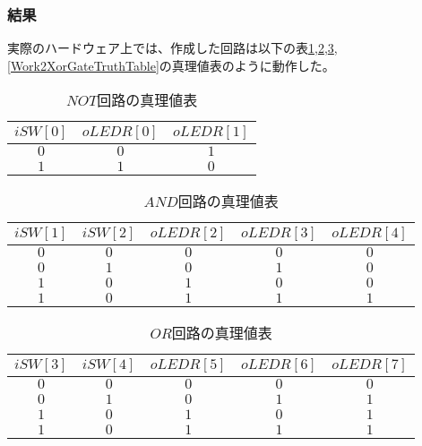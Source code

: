 \documentclass[a4paper]{jarticle}
\begin{document}
\subsubsection{結果}
実際のハードウェア上では、作成した回路は以下の表\ref{Work2NotGateTruthTable},\ref{Work2AndGateTruthTable},\ref{Work2OrGateTruthTable},\ref{Work2XorGateTruthTable}の真理値表のように動作した。
\begin{table}[ht]
	\begin{center}
		\caption{$NOT$回路の真理値表}
		\label{Work2NotGateTruthTable}
		\begin{tabular}{|c|c|c|}
			\hline
			$iSW \left[ 0 \right]$	&$oLEDR \left[ 0 \right]$	&$oLEDR \left[ 1 \right]$\\	\hline\hline
			$0$			&$0$				&$1$\\				\hline
			$1$			&$1$				&$0$\\				\hline
		\end{tabular}
	\end{center}
\end{table}
\begin{table}[ht]
	\begin{center}
		\caption{$AND$回路の真理値表}
		\label{Work2AndGateTruthTable}
		\begin{tabular}{|c|c|c|c|c|}
			\hline
			$iSW \left[ 1 \right]$	&$iSW \left[ 2 \right]$	&$oLEDR \left[ 2 \right]$	&$oLEDR \left[ 3 \right]$	&$oLEDR \left[ 4 \right]$\\	\hline\hline
			$0$			&$0$			&$0$				&$0$				&$0$\\				\hline
			$0$			&$1$			&$0$				&$1$				&$0$\\				\hline
			$1$			&$0$			&$1$				&$0$				&$0$\\				\hline
			$1$			&$0$			&$1$				&$1$				&$1$\\				\hline
		\end{tabular}
	\end{center}
\end{table}
\begin{table}[ht]
	\begin{center}
		\caption{$OR$回路の真理値表}
		\label{Work2OrGateTruthTable}
		\begin{tabular}{|c|c|c|c|c|}
			\hline
			$iSW \left[ 3 \right]$	&$iSW \left[ 4 \right]$	&$oLEDR \left[ 5 \right]$	&$oLEDR \left[ 6 \right]$	&$oLEDR \left[ 7 \right]$\\	\hline\hline
			$0$			&$0$			&$0$				&$0$				&$0$\\				\hline
			$0$			&$1$			&$0$				&$1$				&$1$\\				\hline
			$1$			&$0$			&$1$				&$0$				&$1$\\				\hline
			$1$			&$0$			&$1$				&$1$				&$1$\\				\hline
		\end{tabular}
	\end{center}
\end{table}
\end{document}

